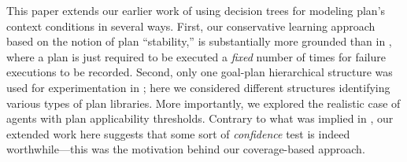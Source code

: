 This paper extends our earlier work \cite{Airiau:IJAT09} of using decision trees for modeling plan's context conditions in several ways.
First, our conservative learning approach based on the notion of plan
``stability,'' is substantially more grounded than in \cite{Airiau:IJAT09},
where a plan is just required to be executed a \emph{fixed} number of times for
failure executions to be recorded.
Second, only one goal-plan hierarchical structure was used for experimentation
in \cite{Airiau:IJAT09}; here we considered different structures identifying
various types of plan libraries.
More importantly, we explored the realistic case of agents with
plan applicability thresholds. Contrary to what was implied in \cite{Airiau:IJAT09}, our extended work here suggests
that some sort of \emph{confidence} test is indeed
worthwhile---this was the motivation behind our coverage-based approach.
